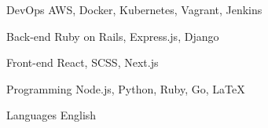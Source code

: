 

\begin{cvskills}

  \cvskill
    {DevOps} %
    {AWS, Docker, Kubernetes, Vagrant, Jenkins} %

  \cvskill
    {Back-end} %
    {Ruby on Rails, Express.js, Django} %

  \cvskill
    {Front-end} %
    {React, SCSS, Next.js}%

  \cvskill
    {Programming} %
    {Node.js, Python, Ruby, Go, LaTeX} %

  \cvskill
    {Languages} %
    {English} %

\end{cvskills}
